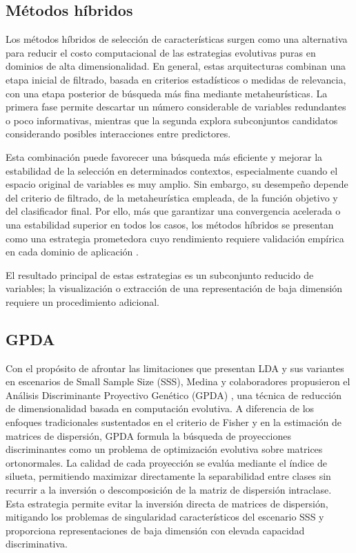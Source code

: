 \subsection{Métodos híbridos}

Los métodos híbridos de selección de características surgen como una alternativa para reducir el costo computacional de las estrategias evolutivas puras en dominios de alta dimensionalidad. En general, estas arquitecturas combinan una etapa inicial de filtrado, basada en criterios estadísticos o medidas de relevancia, con una etapa posterior de búsqueda más fina mediante metaheurísticas. La primera fase permite descartar un número considerable de variables redundantes o poco informativas, mientras que la segunda explora subconjuntos candidatos considerando posibles interacciones entre predictores.

Esta combinación puede favorecer una búsqueda más eficiente y mejorar la estabilidad de la selección en determinados contextos, especialmente cuando el espacio original de variables es muy amplio. Sin embargo, su desempeño depende del criterio de filtrado, de la metaheurística empleada, de la función objetivo y del clasificador final. Por ello, más que garantizar una convergencia acelerada o una estabilidad superior en todos los casos, los métodos híbridos se presentan como una estrategia prometedora cuyo rendimiento requiere validación empírica en cada dominio de aplicación \cite{wang2022hybrid} \cite{manhrawy2026hybrid}.

El resultado principal de estas estrategias es un subconjunto reducido de variables; la visualización o extracción de una representación de baja dimensión requiere un procedimiento adicional.

\subsection{GPDA}

Con el propósito de afrontar las limitaciones que presentan LDA y sus variantes en escenarios de Small Sample Size (SSS), Medina y colaboradores  propusieron el Análisis Discriminante Proyectivo Genético (GPDA) \cite{medina2025genetic}, una técnica de reducción de dimensionalidad basada en computación evolutiva. A diferencia de los enfoques tradicionales sustentados en el criterio de Fisher y en la estimación de matrices de dispersión, GPDA formula la búsqueda de proyecciones discriminantes como un problema de optimización evolutiva sobre matrices ortonormales. La calidad de cada proyección se evalúa mediante el índice de silueta, permitiendo maximizar directamente la separabilidad entre clases sin recurrir a la inversión o descomposición de la matriz de dispersión intraclase. Esta estrategia permite evitar la inversión directa de matrices de dispersión, mitigando los problemas de singularidad característicos del escenario SSS y proporciona representaciones de baja dimensión con elevada capacidad discriminativa.

